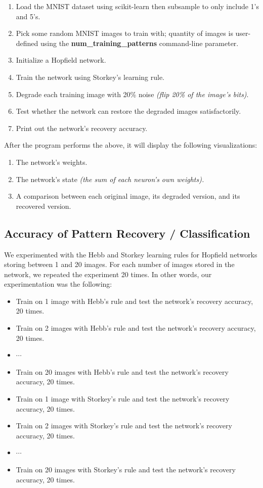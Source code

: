 \documentclass[11pt]{article}
\providecommand{\tightlist}{%
  \setlength{\itemsep}{0pt}\setlength{\parskip}{0pt}}
\begin{document}
\begin{enumerate}
	\def\labelenumi{\arabic{enumi}.}
	\tightlist
	\item Load the MNIST dataset using scikit-learn then subsample to only include 1's and 5's.
	\item Pick some random MNIST images to train with; quantity of images is user-defined using the \textbf{num\_training\_patterns} command-line parameter.
	\item Initialize a Hopfield network.
	\item Train the network using Storkey's learning rule.
	\item Degrade each training image with 20\% noise \textit{(flip 20\% of the image's bits)}.
	\item Test whether the network can restore the degraded images satisfactorily.
	\item Print out the network's recovery accuracy.
\end{enumerate}

After the program performs the above, it will display the following
visualizations:

\begin{enumerate}
	\def\labelenumi{\arabic{enumi}.}
	\tightlist
	\item The network's weights.
	\item The network's state \textit{(the sum of each neuron's own weights).}
	\item A comparison between each original image, its degraded version, and its recovered version.
\end{enumerate}

\subsection{Accuracy of Pattern Recovery / Classification}\label{accuracy-of-pattern-recovery-classification}

We experimented with the Hebb and Storkey learning rules for Hopfield
networks storing between 1 and 20 images. For each number of images
stored in the network, we repeated the experiment 20 times. In other
words, our experimentation was the following:

\begin{itemize}
\item
  Train on 1 image with Hebb's rule and test the network's
  recovery accuracy, 20 times.
\item
  Train on 2 images with Hebb's rule and test the network's
  recovery accuracy, 20 times.
\item
  \(\cdots\)
\item
  Train on 20 images with Hebb's rule and test the network's
  recovery accuracy, 20 times.
\item
  Train on 1 image with Storkey's rule and test the network's
  recovery accuracy, 20 times.
\item
  Train on 2 images with Storkey's rule and test the network's
  recovery accuracy, 20 times.
\item
  \(\cdots\)
\item
  Train on 20 images with Storkey's rule and test the network's
  recovery accuracy, 20 times.
\end{itemize}
\end{document}
